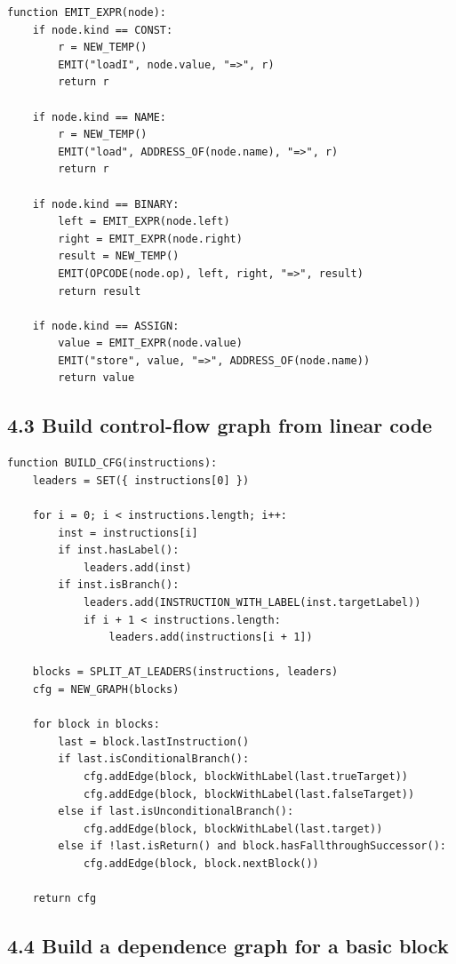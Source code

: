 \documentclass[10pt,letterpaper]{article}
\begin{document}
\begin{verbatim}
function EMIT_EXPR(node):
    if node.kind == CONST:
        r = NEW_TEMP()
        EMIT("loadI", node.value, "=>", r)
        return r

    if node.kind == NAME:
        r = NEW_TEMP()
        EMIT("load", ADDRESS_OF(node.name), "=>", r)
        return r

    if node.kind == BINARY:
        left = EMIT_EXPR(node.left)
        right = EMIT_EXPR(node.right)
        result = NEW_TEMP()
        EMIT(OPCODE(node.op), left, right, "=>", result)
        return result

    if node.kind == ASSIGN:
        value = EMIT_EXPR(node.value)
        EMIT("store", value, "=>", ADDRESS_OF(node.name))
        return value
\end{verbatim}

\subsection*{4.3 Build control-flow graph from linear code}
{}

\begin{verbatim}
function BUILD_CFG(instructions):
    leaders = SET({ instructions[0] })

    for i = 0; i < instructions.length; i++:
        inst = instructions[i]
        if inst.hasLabel():
            leaders.add(inst)
        if inst.isBranch():
            leaders.add(INSTRUCTION_WITH_LABEL(inst.targetLabel))
            if i + 1 < instructions.length:
                leaders.add(instructions[i + 1])

    blocks = SPLIT_AT_LEADERS(instructions, leaders)
    cfg = NEW_GRAPH(blocks)

    for block in blocks:
        last = block.lastInstruction()
        if last.isConditionalBranch():
            cfg.addEdge(block, blockWithLabel(last.trueTarget))
            cfg.addEdge(block, blockWithLabel(last.falseTarget))
        else if last.isUnconditionalBranch():
            cfg.addEdge(block, blockWithLabel(last.target))
        else if !last.isReturn() and block.hasFallthroughSuccessor():
            cfg.addEdge(block, block.nextBlock())

    return cfg
\end{verbatim}

\subsection*{4.4 Build a dependence graph for a basic block}
{}
\end{document}
